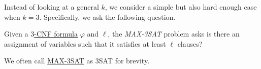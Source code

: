 Instead of looking at a general \(k\), we consider a simple but also hard enough case when \(k = 3\). Specifically, we ask the following question.
\begin{problem}\label{prb:max-3SAT}
Given a \hyperref[def:k-CNF]{\(3\)-CNF formula} \(\varphi\) and \(\ell\), the \emph{MAX-3SAT} problem asks is there an assignment of variables such that it satisfies at least \(\ell \) clauses?
\end{problem}

\begin{remark}
	We often call \hyperref[prb:max-3SAT]{MAX-3SAT} as 3SAT for brevity.
\end{remark}